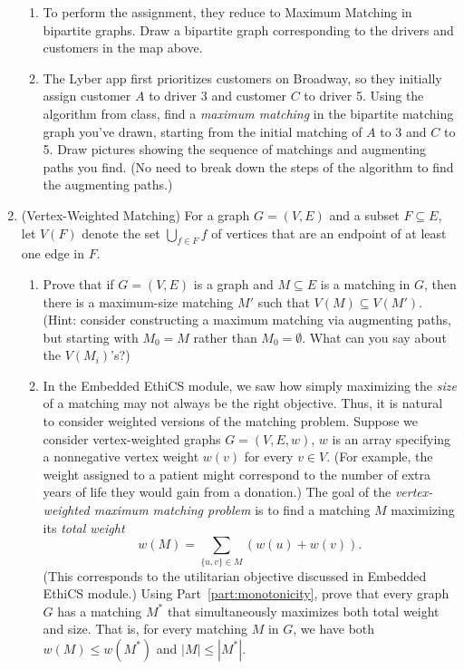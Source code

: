 \documentclass[11pt]{article}
\begin{document}
\begin{enumerate}
    \begin{enumerate}
        \item To perform the assignment, they reduce to Maximum Matching in bipartite graphs.  Draw a bipartite graph corresponding to the drivers and customers in the map above.
        
        \item The Lyber app first prioritizes customers on Broadway, so they initially assign customer $A$ to driver 3 and customer $C$ to driver 5. Using the algorithm from class, find a \textit{maximum matching} in the bipartite matching graph you've drawn, starting from the initial matching of $A$ to 3 and $C$ to 5. Draw pictures showing the sequence of matchings and augmenting paths you find. (No need to break down the steps of the algorithm to find the augmenting paths.)
    \end{enumerate}

    \item (Vertex-Weighted Matching)
        For a graph $G=(V,E)$ and a subset $F\subseteq E$, let $V(F)$ denote the set $\bigcup_{f \in F}f$ of vertices that are an endpoint of at least one edge in $F$.
        \begin{enumerate}
            \item Prove that if $G=(V,E)$ is a graph and $M\subseteq E$ is a matching in $G$, then there is a maximum-size matching $M'$ such that $V(M)\subseteq V(M')$.  (Hint: consider constructing a maximum matching via augmenting paths, but starting with $M_0=M$ rather than $M_0=\emptyset$. What can you say about the $V(M_i)$'s?) \label{part:monotonicity}\\

        \item   In the Embedded EthiCS module, we saw how simply maximizing the {\em size} of a matching may not always be the right objective.  Thus, it is natural to consider weighted versions of the matching problem. Suppose 
        we consider vertex-weighted graphs $G = (V,E,w)$, $w$ is an array specifying a nonnegative vertex weight $w(v)$ for every $v\in V$.  (For example, the weight assigned to a patient might correspond to the number of extra years of life they would gain from a donation.)
          The goal of the {\em vertex-weighted maximum matching problem} is to find a matching $M$ maximizing its {\em total weight} $$w(M) = \sum_{\{u,v\}\in M} (w(u)+w(v)).$$
        (This corresponds to the utilitarian objective discussed in Embedded EthiCS module.)
        Using Part~\ref{part:monotonicity}, prove that every graph $G$ has a matching $M^*$ that simultaneously maximizes both total weight and size.  That is, for every matching $M$ in $G$, we have
        both $w(M)\leq w(M^*)$ and $|M|\leq |M^*|$.


\end{enumerate}
\end{enumerate}
\end{document}
